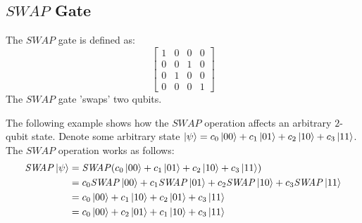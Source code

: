 \subsection{\texorpdfstring{$\mathit{SWAP}$}{} Gate}
\label{subsubsection:SWAP}
The $\mathit{SWAP}$ gate is defined as:
$$\begin{bmatrix} 1 & 0 & 0 & 0 \\ 0 & 0 & 1 & 0 \\ 0 & 1 & 0 & 0 \\ 0 & 0 & 0 & 1\end{bmatrix}$$
The $\mathit{SWAP}$ gate 'swaps' two qubits.
\begin{example}
The following example shows how the $\mathit{SWAP}$ operation affects an arbitrary $2$-qubit state. Denote some arbitrary state $\ket{\psi} = c_0\ket{00} + c_1\ket{01} + c_2\ket{10} + c_3\ket{11}$. The $\mathit{SWAP}$ operation works as follows:
\begin{align}
\mathit{SWAP}\ket{\psi} &= \mathit{SWAP}(c_0\ket{00} + c_1\ket{01} + c_2\ket{10} + c_3\ket{11})\\
&= c_0\mathit{SWAP}\ket{00} + c_1\mathit{SWAP}\ket{01} + c_2\mathit{SWAP}\ket{10} + c_3\mathit{SWAP}\ket{11}\\
&= c_0\ket{00} + c_1\ket{10} + c_2\ket{01} + c_3\ket{11}\\
&= c_0\ket{00} + c_2\ket{01} + c_1\ket{10} + c_3\ket{11}
\end{align}
\end{example}

